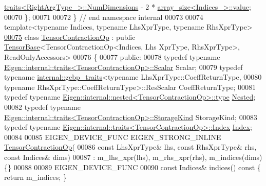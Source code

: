 \begin{DoxyCode}
       \hyperlink{struct_eigen_1_1internal_1_1traits}{traits<RightArgType\_>::NumDimensions} - 2 * 
      \hyperlink{struct_eigen_1_1internal_1_1array__size}{array\_size<Indices\_>::value};
00070 \};
00071 
00072 \}  \textcolor{comment}{// end namespace internal}
00073 
00074 \textcolor{keyword}{template}<\textcolor{keyword}{typename} Indices, \textcolor{keyword}{typename} LhsXprType, \textcolor{keyword}{typename} RhsXprType>
\hyperlink{class_eigen_1_1_tensor_contraction_op}{00075} \textcolor{keyword}{class }\hyperlink{class_eigen_1_1_tensor_contraction_op}{TensorContractionOp} : \textcolor{keyword}{public} \hyperlink{class_eigen_1_1_tensor_base}{TensorBase}<TensorContractionOp<Indices, Lhs
      XprType, RhsXprType>, ReadOnlyAccessors>
00076 \{
00077   \textcolor{keyword}{public}:
00078   \textcolor{keyword}{typedef} \textcolor{keyword}{typename} \hyperlink{struct_eigen_1_1internal_1_1traits}{Eigen::internal::traits<TensorContractionOp>::Scalar}
       Scalar;
00079   \textcolor{keyword}{typedef} \textcolor{keyword}{typename} \hyperlink{class_eigen_1_1internal_1_1gebp__traits}{internal::gebp\_traits}<\textcolor{keyword}{typename} LhsXprType::CoeffReturnType,
00080                                                    \textcolor{keyword}{typename} RhsXprType::CoeffReturnType>::ResScalar 
      CoeffReturnType;
00081   \textcolor{keyword}{typedef} \textcolor{keyword}{typename} \hyperlink{class_eigen_1_1internal_1_1_tensor_lazy_evaluator_writable}{Eigen::internal::nested<TensorContractionOp>::type}
       \hyperlink{class_eigen_1_1internal_1_1_tensor_lazy_evaluator_writable}{Nested};
00082   \textcolor{keyword}{typedef} \textcolor{keyword}{typename} \hyperlink{struct_eigen_1_1internal_1_1traits}{Eigen::internal::traits<TensorContractionOp>::StorageKind}
       StorageKind;
00083   \textcolor{keyword}{typedef} \textcolor{keyword}{typename} \hyperlink{struct_eigen_1_1internal_1_1traits}{Eigen::internal::traits<TensorContractionOp>::Index}
       \hyperlink{namespace_eigen_a62e77e0933482dafde8fe197d9a2cfde}{Index};
00084 
00085   EIGEN\_DEVICE\_FUNC EIGEN\_STRONG\_INLINE \hyperlink{class_eigen_1_1_tensor_contraction_op}{TensorContractionOp}(
00086       \textcolor{keyword}{const} LhsXprType& lhs, \textcolor{keyword}{const} RhsXprType& rhs, \textcolor{keyword}{const} Indices& dims)
00087       : m\_lhs\_xpr(lhs), m\_rhs\_xpr(rhs), m\_indices(dims) \{\}
00088 
00089   EIGEN\_DEVICE\_FUNC
00090   \textcolor{keyword}{const} Indices& indices()\textcolor{keyword}{ const }\{ \textcolor{keywordflow}{return} m\_indices; \}

\end{DoxyCode}
